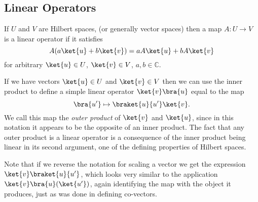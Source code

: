 \subsection{Linear Operators}
If $U$ and $V$ are Hilbert spaces, (or generally vector spaces) then a map $A: U \to V$ is a linear operator if it satisfies
\[A(a\ket{u} + b\ket{v}) = aA\ket{u} + bA\ket{v}\]
for arbitrary $\ket{u} \in U$, $\ket{v} \in V$, $a, b \in \mathbb{C}$.

If we have vectors $\ket{u} \in U$ and $\ket{v} \in V$ then we can use the inner product to define a simple linear operator $\ket{v}\bra{u}$ equal to the map
\[\bra{u'} \mapsto \braket{u}{u'}\ket{v}.\]
We call this map the \emph{outer product} of $\ket{v}$ and $\ket{u}$, since in this notation it appears to be the opposite of an inner product. The fact that any outer product is a linear operator is a consequence of the inner product being linear in its second argument, one of the defining properties of Hilbert spaces.

Note that if we reverse the notation for scaling a vector we get the expression $\ket{v}\braket{u}{u'}$, which looks very similar to the application $\ket{v}\bra{u}(\ket{u'})$, again identifying the map with the object it produces, just as was done in defining co-vectors.


